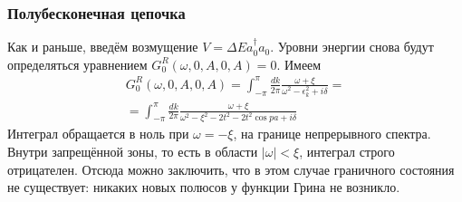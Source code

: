 \subsubsection{Полубесконечная цепочка}
Как и раньше, введём возмущение $V = \Delta E a_0^\dagger a_0$. Уровни энергии снова 
будут определяться уравнением
$G_0^R(\omega,0,A,0,A) = 0 $.
Имеем 
\begin{multline}
	G_0^R(\omega,0,A,0,A) = \int_{-\pi}^{\pi} \frac{dk}{2\pi}
			\frac{\omega + \xi}{\omega^2 - \epsilon_k^2 + i\delta} =  \\
					=\int_{-\pi}^{\pi} \frac{dk}{2\pi} 
			\frac{\omega + \xi}{\omega^2 - \xi^2 - 2t^2 - 2t^2\cos{pa} + i\delta} 
\end{multline}
Интеграл обращается в ноль при $\omega = -\xi$, на границе непрерывного спектра. Внутри
запрещённой зоны, то есть в области $|\omega| < \xi$, интеграл строго отрицателен. Отсюда
можно заключить, что в этом случае граничного состояния не существует: никаких новых
полюсов у функции Грина не возникло.
